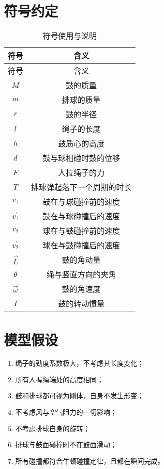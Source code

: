 \documentclass[withoutpreface,bwprint]{cumcmthesis} %
\begin{document}
\section{符号约定}
\begin{longtable}[c]{cc}
    \caption{符号使用与说明}\label{tab:001}\\
        \toprule[1.5pt] 符号 & 含义\\ \hline \hline \endfirsthead %
        \toprule[1.5pt]  符号 & 含义\\ \hline  \hline \endhead %
        $M$ & 鼓的质量\\
        \hline
        $m$ & 排球的质量\\
        \hline
        $r$ & 鼓的半径\\
        \hline
        $l$ & 绳子的长度\\
        \hline
        $h$ & 鼓质心的高度\\
        \hline
        $d$ & 鼓与球相碰时鼓的位移\\
        \hline
        ${F}$ & 人拉绳子的力\\
        \hline
        $T$ & 排球弹起落下一个周期的时长\\
        \hline
        $v_1$ & 鼓在与球碰撞前的速度\\
        \hline
        $v_1^{'}$ & 鼓在与球碰撞后的速度\\
        \hline
        $v_2$ & 球在与鼓碰撞前的速度\\
        \hline
        $v_2^{'}$ & 球在与鼓碰撞后的速度\\
        \hline
        $\overrightarrow{L}$ & 鼓的角动量\\
        \hline
        $\theta$ & 绳与竖直方向的夹角\\
        \hline
        $\overrightarrow{\omega}$ & 鼓的角速度\\
        \hline
        $I$ & 鼓的转动惯量\\
        \bottomrule[1.5pt]
\end{longtable}

\section{模型假设}

\begin{enumerate}
	\item 绳子的劲度系数极大，不考虑其长度变化；
	\item 所有人握绳端处的高度相同；
	\item 鼓和排球都可视为刚体，自身不发生形变；
	\item 不考虑风与空气阻力的一切影响；
	\item 不考虑排球自身的旋转；
	\item 排球与鼓面碰撞时不在鼓面滑动；
	\item 所有碰撞都符合牛顿碰撞定律，且都在瞬间完成。
\end{enumerate}
\end{document}
